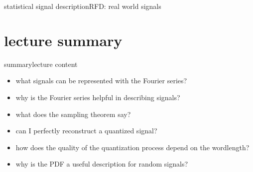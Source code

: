             \begin{frame}{statistical signal description}{RFD: real world signals}
            \end{frame}	
    
    \section[summary]{lecture summary}
        \begin{frame}{summary}{lecture content}
            \begin{itemize}
                \item       what signals can be represented with the Fourier series?
                \bigskip
                \item<2->   why is the Fourier series helpful in describing signals?
                \bigskip
                \item<3->   what does the sampling theorem say?
                \bigskip
                \item<4->   can I perfectly reconstruct a quantized signal?
                \bigskip
                \item<5->   how does the quality of the quantization process depend on the wordlength?
                \bigskip
                \item<6->   why is the PDF a useful description for random signals?
            \end{itemize}
        \end{frame}


